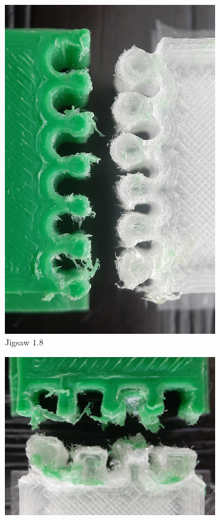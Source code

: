 \begin{figure}
\begin{subfigure}[B]{.18\columnwidth}
		\includegraphics[height=\figheight]{sources/testing/jigsaw_cropped.jpg}
		\caption{Jigsaw $1.8$}
		\label{fig:failures_jigsaw}
	\end{subfigure}
	\begin{subfigure}[B]{.22\columnwidth}
		\centering
		\includegraphics[width=\figheight,rotate=90]{sources/testing/suture_wide_cropped.jpg}

\end{subfigure}
\end{figure}
